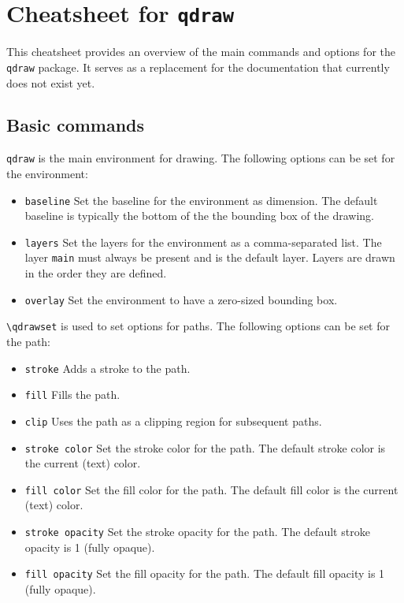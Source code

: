 \documentclass{article}
\begin{document}
\section*{Cheatsheet for \texttt{qdraw}}

This cheatsheet provides an overview of the main commands and options for the \texttt{qdraw} package. It serves as a replacement for the documentation that currently does not exist yet.

\subsection*{Basic commands}

\verb|qdraw| is the main environment for drawing. The following options can be set for the environment:
\begin{itemize}
    \item \verb|baseline| Set the baseline for the environment as dimension. The default baseline is typically the bottom of the the bounding box of the drawing.
    \item \verb|layers| Set the layers for the environment as a comma-separated list. The layer \verb|main| must always be present and is the default layer. Layers are drawn in the order they are defined.
    \item \verb|overlay| Set the environment to have a zero-sized bounding box.
\end{itemize}

\verb|\qdrawset| is used to set options for paths. The following options can be set for the path:
\begin{itemize}
    \item \verb|stroke| Adds a stroke to the path.
    \item \verb|fill| Fills the path.
    \item \verb|clip| Uses the path as a clipping region for subsequent paths.
\end{itemize}


\begin{itemize}
    \item \verb|stroke color| Set the stroke color for the path. The default stroke color is the current (text) color.
    \item \verb|fill color| Set the fill color for the path. The default fill color is the current (text) color.
    \item \verb|stroke opacity| Set the stroke opacity for the path. The default stroke opacity is \num{1} (fully opaque).
    \item \verb|fill opacity| Set the fill opacity for the path. The default fill opacity is \num{1} (fully opaque).
\end{itemize}
\end{document}
